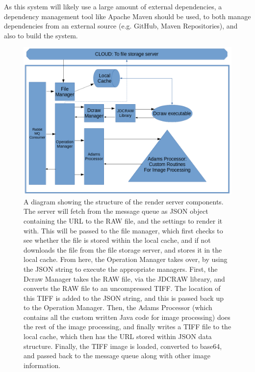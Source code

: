 \documentclass[12pt,a4paper]{article}
\begin{document}
As this system will likely use a large amount of external dependencies, a dependency management tool
like Apache Maven should be used, to both manage dependencies from an external source (e.g. GitHub, Maven
Repositories), and also to build the system.

\begin{figure}[h]
    \centering
    \includegraphics[width=1\textwidth]{renderserverdiagram}
    \caption{A diagram showing the structure of the render server components. The server will fetch from the message queue as JSON object containing the URL to the RAW file, and the settings to render it with. This will be passed to the file manager, which first checks to see whether the file is stored within the local cache, and if not downloads the file from the file storage server, and stores it in the local cache. From here, the Operation Manager takes over, by using the JSON string to execute the appropriate managers. First, the Dcraw Manager takes the RAW file, via the JDCRAW library, and converts the RAW file to an uncompressed TIFF. The location of this TIFF is added to the JSON string, and this is passed back up to the Operation Manager. Then, the Adams Processor (which contains all the custom written Java code for image processing) does the rest of the image processing, and finally writes a TIFF file to the local cache, which then has the URL stored within JSON data structure. Finally, the TIFF image is loaded, converted to base64, and passed back to the message queue along with other image information. }
    \label{RenderServerDiagram}
\end{figure}
\end{document}
